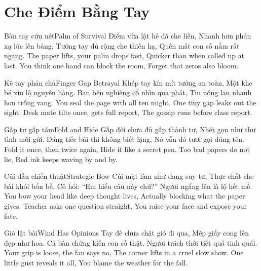 \chapter{Che Điểm Bằng Tay}

\begin{tutuyetbox}{Bàn tay cứu nét}{Palm of Survival}
Điểm vừa lật hé đã che liền,
Nhanh hơn phản xạ lúc lên bảng.
Tưởng tay đủ rộng che thiên hạ,
Quên mất con số nằm rất ngang.
\tcblower
The paper lifts, your palm drops fast,
Quicker than when called up at last.
You think one hand can block the room,
Forget that zeros also bloom.
\end{tutuyetbox}

\begin{tutuyetbox}{Kẽ tay phản chủ}{Finger Gap Betrayal}
Khép tay kín mít tưởng an toàn,
Một khe bé xíu lộ nguyên hàng.
Bạn bên nghiêng cổ nhìn qua phát,
Tin nóng lan nhanh hơn trống vang.
\tcblower
You seal the page with all ten might,
One tiny gap leaks out the sight.
Desk mate tilts once, gets full report,
The gossip runs before class report.
\end{tutuyetbox}

\begin{tutuyetbox}{Gấp tư gấp tám}{Fold and Hide}
Gấp đôi chưa đủ gấp thành tư,
Nhét gọn như thư tình mới gửi.
Đáng tiếc bài thi không biết lặng,
Nó vẫn đỏ tươi gọi đúng tên.
\tcblower
Fold it once, then twice again,
Hide it like a secret pen.
Too bad papers do not lie,
Red ink keeps waving by and by.
\end{tutuyetbox}

\begin{tutuyetbox}{Cúi đầu chiến thuật}{Strategic Bow}
Cúi mặt làm như đang suy tư,
Thực chất che bài khỏi bốn bề.
Cô hỏi: “Em hiểu câu này chứ?”
Ngươi ngẩng lên là lộ hết mê.
\tcblower
You bow your head like deep thought lives,
Actually blocking what the paper gives.
Teacher asks one question straight,
You raise your face and expose your fate.
\end{tutuyetbox}

\begin{tutuyetbox}{Gió lật bài}{Wind Has Opinions}
Tay đè chưa chặt gió đi qua,
Mép giấy cong lên đẹp như hoa.
Cả bàn chứng kiến con số thật,
Ngươi trách thời tiết quá tinh quái.
\tcblower
Your grip is loose, the fan says no,
The corner lifts in a cruel slow show.
One little gust reveals it all,
You blame the weather for the fall.
\end{tutuyetbox}

